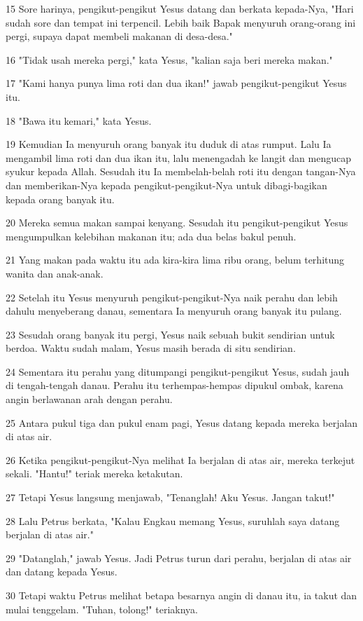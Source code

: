 \par 15 Sore harinya, pengikut-pengikut Yesus datang dan berkata kepada-Nya, "Hari sudah sore dan tempat ini terpencil. Lebih baik Bapak menyuruh orang-orang ini pergi, supaya dapat membeli makanan di desa-desa."
\par 16 "Tidak usah mereka pergi," kata Yesus, "kalian saja beri mereka makan."
\par 17 "Kami hanya punya lima roti dan dua ikan!" jawab pengikut-pengikut Yesus itu.
\par 18 "Bawa itu kemari," kata Yesus.
\par 19 Kemudian Ia menyuruh orang banyak itu duduk di atas rumput. Lalu Ia mengambil lima roti dan dua ikan itu, lalu menengadah ke langit dan mengucap syukur kepada Allah. Sesudah itu Ia membelah-belah roti itu dengan tangan-Nya dan memberikan-Nya kepada pengikut-pengikut-Nya untuk dibagi-bagikan kepada orang banyak itu.
\par 20 Mereka semua makan sampai kenyang. Sesudah itu pengikut-pengikut Yesus mengumpulkan kelebihan makanan itu; ada dua belas bakul penuh.
\par 21 Yang makan pada waktu itu ada kira-kira lima ribu orang, belum terhitung wanita dan anak-anak.
\par 22 Setelah itu Yesus menyuruh pengikut-pengikut-Nya naik perahu dan lebih dahulu menyeberang danau, sementara Ia menyuruh orang banyak itu pulang.
\par 23 Sesudah orang banyak itu pergi, Yesus naik sebuah bukit sendirian untuk berdoa. Waktu sudah malam, Yesus masih berada di situ sendirian.
\par 24 Sementara itu perahu yang ditumpangi pengikut-pengikut Yesus, sudah jauh di tengah-tengah danau. Perahu itu terhempas-hempas dipukul ombak, karena angin berlawanan arah dengan perahu.
\par 25 Antara pukul tiga dan pukul enam pagi, Yesus datang kepada mereka berjalan di atas air.
\par 26 Ketika pengikut-pengikut-Nya melihat Ia berjalan di atas air, mereka terkejut sekali. "Hantu!" teriak mereka ketakutan.
\par 27 Tetapi Yesus langsung menjawab, "Tenanglah! Aku Yesus. Jangan takut!"
\par 28 Lalu Petrus berkata, "Kalau Engkau memang Yesus, suruhlah saya datang berjalan di atas air."
\par 29 "Datanglah," jawab Yesus. Jadi Petrus turun dari perahu, berjalan di atas air dan datang kepada Yesus.
\par 30 Tetapi waktu Petrus melihat betapa besarnya angin di danau itu, ia takut dan mulai tenggelam. "Tuhan, tolong!" teriaknya.
